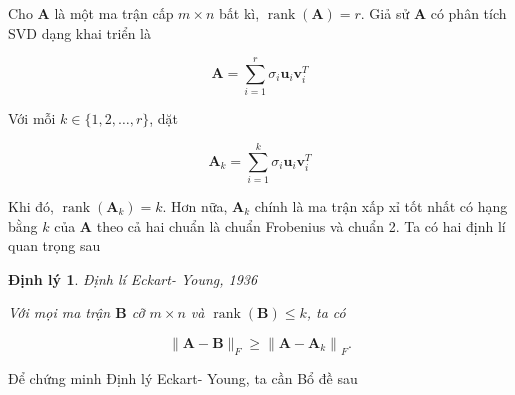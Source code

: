 \documentclass[12pt,a4paper,oneside]{report}
\newtheorem{dl}{Định lý}[section]
\numberwithin{equation}{section}
\begin{document}
Cho $\mathbf{A}$ là một ma trận cấp $m \times n$ bất kì, $\operatorname{rank}(\mathbf{A})=r$. Giả sử $\mathbf{A}$ có phân tích SVD dạng khai triển là

$$
\mathbf{A}=\sum_{i=1}^{r} \sigma_{i} \mathbf{u}_{i} \mathbf{v}_{i}^{T}
$$

Với mỗi $k \in\{1,2, \ldots, r\}$, dặt

$$
\mathbf{A}_{k}=\sum_{i=1}^{k} \sigma_{i} \mathbf{u}_{i} \mathbf{v}_{i}^{T}
$$

Khi đó, $\operatorname{rank}\left(\mathbf{A}_{k}\right)=k$. Hơn nữa, $\mathbf{A}_{k}$ chính là ma trận xấp xỉ tốt nhất có hạng bằng $k$ của $\mathbf{A}$ theo cả hai chuẩn là chuẩn Frobenius và chuẩn 2. Ta có hai định lí quan trọng sau

\begin{dl}\cite{eckart1936}{Định lí Eckart- Young, 1936}  \label{eckart}

Với mọi ma trận $\mathbf{B}$ cỡ $m \times n$ và $\operatorname{rank}(\mathbf{B}) \leqslant k$, ta có

$$
\|\mathbf{A}-\mathbf{B}\|_{F} \geqslant\left\|\mathbf{A}-\mathbf{A}_{k}\right\|_{F} .
$$
\end{dl}
Để chứng minh Định lý Eckart- Young, ta cần Bổ đề sau
\end{document}
